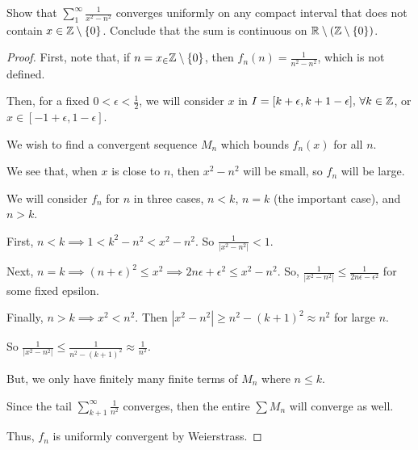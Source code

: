 \documentclass[../hw3]{subfiles}
\begin{document}
\begin{problem}
Show that $\sum_{1}^{\infty} \frac{1}{x^2-n^2}$ converges uniformly on any compact interval that does not contain $x \in \mathbb{Z}\setminus \{0\} $.
Conclude that the sum is continuous on $\mathbb{R}\setminus(\mathbb{Z}\setminus \{0\} )$.
\end{problem}
\begin{proof}
	First, note that, if $n=x_\in \mathbb{Z}\setminus \{0\} $, then $f_n(n)=\frac{1}{n^2 - n^2}$, which is not defined.

	Then, for a fixed $0<\epsilon<\frac{1}{2}$, we will consider $x$ in $I = [k+\epsilon,k + 1-\epsilon],\, \forall k\in \mathbb{Z}$, or $x \in [-1+\epsilon,1-\epsilon]$.

	We wish to find a convergent sequence $M_n$ which bounds  $f_n(x)$ for all $n$.

	We see that, when  $x$ is close to  $n$, then  $x^2-n^2$ will be small, so $f_n$ will be large.

	We will consider $f_n$ for  $n$ in three cases, $n<k$, $n=k$ (the important case), and  $n>k$.

	First,  $n<k\implies 1 < k^2-n^2 < x^2 - n^2$.
	So $\frac{1}{|x^2-n^2|} < 1$.

	Next, $n=k \implies (n+\epsilon)^2\le x^2 \implies 2n\epsilon+\epsilon^2\le x^2-n^2$.
	So, $\frac{1}{|x^2-n^2|} \le \frac{1}{2n\epsilon-\epsilon^2}$ for some fixed epsilon.

	Finally, $n>k \implies x^2 < n^2$.
	Then  $|x^2 - n^2|\ge n^2-{(k+1)}^2 \approx n^2$ for large $n$.

	So $\frac{1}{|x^2-n^2|}\le \frac{1}{n^2 - {(k + 1)}^2}\approx \frac{1}{n^2}$.

	But, we only have finitely many finite terms of $M_n$ where $n\le k$.

	Since the tail $\sum_{k+1}^{\infty} \frac{1}{n^2}$ converges, then the entire $\sum M_n$ will converge as well.

	Thus, $f_n$ is uniformly convergent by Weierstrass.
\end{proof}
\end{document}
